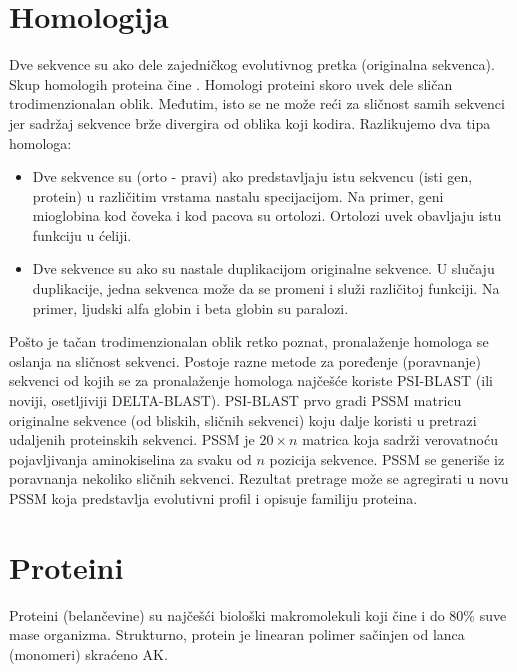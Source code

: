 \section{Homologija}

Dve sekvence su  ako dele zajedničkog evolutivnog pretka
(originalna sekvenca). Skup homologih proteina čine . Homologi proteini skoro uvek dele sličan trodimenzionalan oblik.
Međutim, isto se ne može reći za sličnost samih sekvenci jer sadržaj sekvence
brže divergira od oblika koji kodira. Razlikujemo dva tipa homologa:
\begin{itemize}
  \item
    Dve sekvence su  (orto - pravi) ako predstavljaju istu
    sekvencu (isti gen, protein) u različitim vrstama nastalu specijacijom.
    Na primer, geni mioglobina kod čoveka i kod pacova su ortolozi. Ortolozi
    uvek obavljaju istu funkciju u ćeliji.

  \item Dve sekvence su  ako su nastale duplikacijom
    originalne sekvence. U slučaju duplikacije, jedna sekvenca može
    da se promeni i služi različitoj funkciji. Na primer, ljudski
    alfa globin i beta globin su paralozi.
\end{itemize}

Pošto je tačan trodimenzionalan oblik retko poznat, pronalaženje homologa
se oslanja na sličnost sekvenci. Postoje razne metode za poređenje
(poravnanje) sekvenci od kojih se za pronalaženje homologa najčešće koriste
PSI-BLAST (ili noviji, osetljiviji DELTA-BLAST).  PSI-BLAST  prvo gradi PSSM matricu
originalne sekvence (od bliskih, sličnih sekvenci) koju dalje koristi u pretrazi
udaljenih proteinskih sekvenci. PSSM  je
$20 \times n$ matrica koja sadrži verovatnoću pojavljivanja aminokiselina
za svaku od $n$ pozicija sekvence. PSSM se generiše iz poravnanja nekoliko
sličnih sekvenci. Rezultat pretrage može se agregirati u novu PSSM koja
predstavlja evolutivni profil i opisuje familiju proteina. 

\label{sec:}
\section{Proteini}

Proteini (belančevine) su najčešći biološki makromolekuli koji čine i do $80\%$
suve mase organizma.  Strukturno, protein je linearan polimer sačinjen od lanca
 (monomeri) skraćeno AK.


